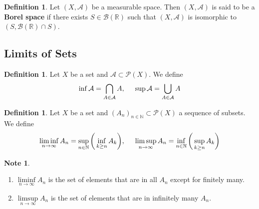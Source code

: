 \documentclass[12pt]{amsart}
\theoremstyle{definition}
\newtheorem{defn}[definition]{Definition}
\newtheorem{note}[definition]{Note}
\newcommand{\N}{\mathbb{N}}
\newcommand{\R}{\mathbb{R}}
\newcommand{\MA}{\mathcal{A}}
\newcommand{\MB}{\mathcal{B}}
\newcommand{\MP}{\mathcal{P}}
\newcommand{\ld}[1]{\label{defn:#1}}
\begin{document}
	
	
	
	
	
	
	
		
	\begin{defn}
		Let $(X, \MA)$ be a measurable space. Then $(X, \MA)$ is said to be a \textbf{Borel space} if there exists $S \in \MB(\R)$ such that $(X, \MA)$ is isomorphic to $(S, \MB(\R) \cap S)$.
	\end{defn}
	
	
	
	
	
	
	
	
	
	
	
	
	
	
	
	
	
	
	
	
	
	
	
	
	
	
	
	\newpage
	\subsection{Limits of Sets}
	
	\begin{defn} \ld{00000} 
		Let $X$ be a set and $\MA \subset \MP(X)$. We define $$\inf \MA = \bigcap_{A \in \MA } A ,\hspace{.5cm} \sup \MA = \bigcup_{A \in \MA} A$$
		
	\end{defn}
	
	\begin{defn} \ld{00000} 
		Let $X$ be a set and $(A_n)_{n \in \N} \subset \MP(X)$ a sequence of subsets. We define
		$$\liminf_{n \rightarrow \infty} A_n = \sup_{n \in \N} \bigg( \inf_{k \geq n}A_k \bigg), \hspace{.5cm } \limsup_{n \rightarrow \infty} A_n = \inf_{n \in \N} \bigg(\sup_{k \geq n}A_k \bigg)$$
	\end{defn}
	
	\begin{note}\
		\begin{enumerate}
			\item $\liminf\limits_{n \rightarrow \infty} A_n$ is the set of elements that are in all $A_n$ except for finitely many. 
			
			\item $\limsup\limits_{n \rightarrow \infty} A_n$ is the set of elements that are in infinitely many $A_n$.
		\end{enumerate}
	\end{note}
	
\end{document}
